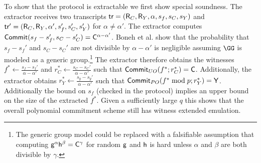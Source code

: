 To show that the protocol is extractable we first show special soundness. The extractor receives two transcripts $\textsf{{tr}}=(\mathsf{R}_C,\mathsf{R}_Y,\alpha,s_f,s_C,s_Y)$ and $\textsf{{tr}}'=(\mathsf{R}_C,\mathsf{R}_Y,\alpha',s_f',s_C',s_Y')$ for $\alpha \neq \alpha'$. The extractor computes $\textsf{{Commit}}(s_f-s_f',s_C-s_C')=\mathsf{C}^{\alpha-\alpha'}$. Boneh et al. \cite{C:BonBunFis19} show that the probability that $s_f-s_f'$ and $s_C-s_C'$  are not divisible by $\alpha-\alpha'$ is negligible assuming $\GG$ is modeled as a generic group.\footnote{The generic group model could be replaced with a falsifiable assumption that computing $\mathsf{g}^\alpha\mathsf{h}^\beta=\mathsf{C}^\gamma$ for random $\mathsf{g}$ and $\mathsf{h}$ is hard unless $\alpha$ and $\beta$ are both divisible by $\gamma$.} The extractor therefore obtains the witnesses $f^* \leftarrow \frac{ s_f-s_f'}{\alpha-\alpha'}$ and $r_C^* \leftarrow \frac{ s_C-s_C'}{\alpha-\alpha'}$ such that $\textsf{{Commit}}_{UO}(f^*; r_C^*)=\mathsf{C}$. Additionally, the extractor obtains $r_Y^* \leftarrow \frac{s_y-s_y'}{\alpha-\alpha'}$ such that $\textsf{{Commit}}_{PO}( f^* \bmod p; r_Y^*)=\mathsf{Y}$. %
 Additionally the bound on $s_f$ (checked in the protocol) implies an upper bound on the size of the extracted $f^*$. 
 Given a sufficiently large $q$ this shows that the overall polynomial commitment scheme still has witness extended emulation.